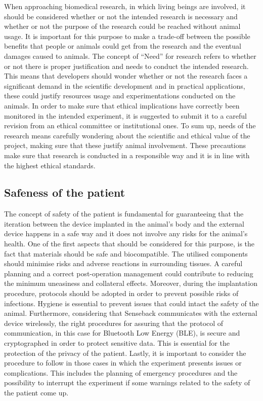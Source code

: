 \documentclass{Configuration_Files/PoliMi3i_thesis}
\begin{document}
When approaching biomedical research, in which living beings are involved, it should be considered whether or not the intended research is necessary and whether or not the purpose of the research could be reached without animal usage. It is important for this purpose to make a trade-off between the possible benefits that people or animals could get from the research and the eventual damages caused to animals. 
The concept of “Need” for research refers to whether or not there is proper justification and needs to conduct the intended research. This means that developers should wonder whether or not the research faces a significant demand in the scientific development and in practical applications, these could justify resources usage and experimentations conducted on the animals.
In order to make sure that ethical implications have correctly been monitored in the intended experiment, it is suggested to submit it to a careful revision from an ethical committee or institutional ones. 
To sum up, needs of the research means carefully wondering about the scientific and ethical value of the project, making sure that these justify animal involvement. These precautions make sure that research is conducted in a responsible way and it is in line with the highest ethical standards.

\subsection{Safeness of the patient}


The concept of safety of the patient is fundamental for guaranteeing that the iteration between the device implanted in the animal’s body and the external device happens in a safe way and it does not involve any risks for the animal's health.
One of the first aspects that should be considered for this purpose, is the fact that materials should be safe and biocompatible. The utilised components should minimise risks and adverse reactions in surrounding tissues. A careful planning and a correct post-operation management could contribute to reducing the minimum uneasiness and collateral effects.
Moreover, during the implantation procedure, protocols should be adopted in order to prevent possible risks of infections. Hygiene is essential to prevent issues that could intact the safety of the animal.
Furthermore, considering that Senseback communicates with the external device wirelessly, the right procedures for assuring that the protocol of communication, in this case for Bluetooth Low Energy (BLE), is secure and cryptographed in order to protect sensitive data. This is essential for the protection of the privacy of the patient.
Lastly, it is important to consider the procedure to follow in those cases in which the experiment presents issues or complications. This includes the planning of emergency procedures and the possibility to interrupt the experiment if some warnings related to the safety of the patient come up.
\end{document}
